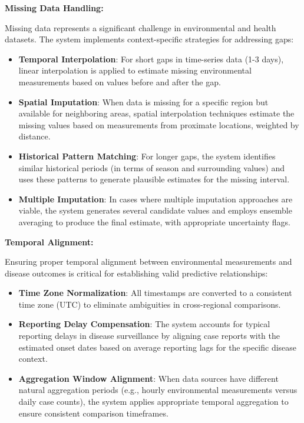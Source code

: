 \documentclass[12pt,a4paper]{report}
\begin{document}
\textbf{Missing Data Handling:}

Missing data represents a significant challenge in environmental and health datasets. The system implements context-specific strategies for addressing gaps:

\begin{itemize}
    \item \textbf{Temporal Interpolation}: For short gaps in time-series data (1-3 days), linear interpolation is applied to estimate missing environmental measurements based on values before and after the gap.
    
    \item \textbf{Spatial Imputation}: When data is missing for a specific region but available for neighboring areas, spatial interpolation techniques estimate the missing values based on measurements from proximate locations, weighted by distance.
    
    \item \textbf{Historical Pattern Matching}: For longer gaps, the system identifies similar historical periods (in terms of season and surrounding values) and uses these patterns to generate plausible estimates for the missing interval.
    
    \item \textbf{Multiple Imputation}: In cases where multiple imputation approaches are viable, the system generates several candidate values and employs ensemble averaging to produce the final estimate, with appropriate uncertainty flags.
\end{itemize}

\textbf{Temporal Alignment:}

Ensuring proper temporal alignment between environmental measurements and disease outcomes is critical for establishing valid predictive relationships:

\begin{itemize}
    \item \textbf{Time Zone Normalization}: All timestamps are converted to a consistent time zone (UTC) to eliminate ambiguities in cross-regional comparisons.
    
    \item \textbf{Reporting Delay Compensation}: The system accounts for typical reporting delays in disease surveillance by aligning case reports with the estimated onset dates based on average reporting lags for the specific disease context.
    
    \item \textbf{Aggregation Window Alignment}: When data sources have different natural aggregation periods (e.g., hourly environmental measurements versus daily case counts), the system applies appropriate temporal aggregation to ensure consistent comparison timeframes.
\end{itemize}
\end{document}
